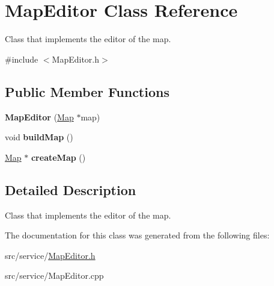 \hypertarget{classMapEditor}{}\section{Map\+Editor Class Reference}
\label{classMapEditor}


Class that implements the editor of the map.  




{\ttfamily \#include $<$Map\+Editor.\+h$>$}

\subsection*{Public Member Functions}
\begin{DoxyCompactItemize}
\item 
\hypertarget{classMapEditor_ac97db3c5e2b0035da5e55b372821090a}{}\label{classMapEditor_ac97db3c5e2b0035da5e55b372821090a} 
{\bfseries Map\+Editor} (\hyperlink{classMap}{Map} $\ast$map)
\item 
\hypertarget{classMapEditor_a9fbff997d42a80e8dc7881147b9ea4f6}{}\label{classMapEditor_a9fbff997d42a80e8dc7881147b9ea4f6} 
void {\bfseries build\+Map} ()
\item 
\hypertarget{classMapEditor_a95ab44a985f0896844f8b982139727fb}{}\label{classMapEditor_a95ab44a985f0896844f8b982139727fb} 
\hyperlink{classMap}{Map} $\ast$ {\bfseries create\+Map} ()
\end{DoxyCompactItemize}


\subsection{Detailed Description}
Class that implements the editor of the map. 

The documentation for this class was generated from the following files\+:\begin{DoxyCompactItemize}
\item 
src/service/\hyperlink{MapEditor_8h}{Map\+Editor.\+h}\item 
src/service/Map\+Editor.\+cpp\end{DoxyCompactItemize}
